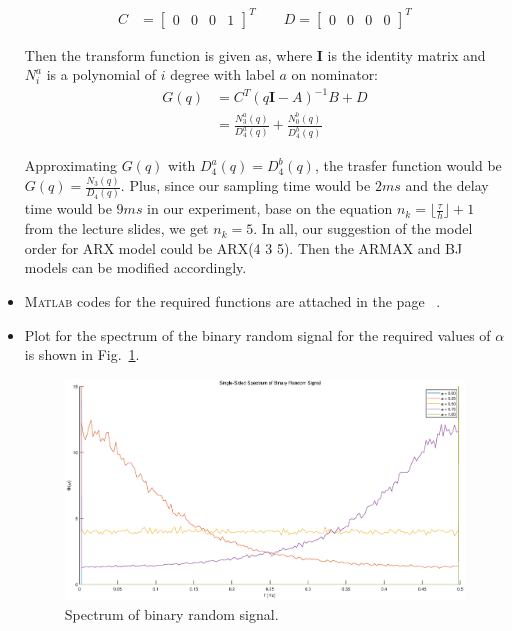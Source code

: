 \documentclass[10pt,a4paper]{article}
\begin{document}
\begin{itemize}
\begin{align}
		C &= \begin{bmatrix} 0 & 0 & 0 & 1 \end{bmatrix}^{T} \qquad D = \begin{bmatrix} 0 & 0 & 0 & 0 \end{bmatrix}^{T}
	\end{align}
	\par Then the transform function is given as, where $\mathbf{I}$ is the identity matrix and $N^{a}_{i}$ is a polynomial of $i$ degree with label $a$ on nominator:
	\begin{align}
		G(q) &= C^{T}(q \mathbf{I} - A)^{-1}B + D \\
		&= \frac{N^{a}_{3}(q)}{D^{a}_{4}(q)} + \frac{N^{b}_{0}(q)}{D^{b}_{4}(q)}
	\end{align}
	\par Approximating $G(q)$ with $D^{a}_{4}(q) = D^{b}_{4}(q)$, the trasfer function would be $G(q) = \frac{N_{3}(q)}{D_{4}(q)}$. Plus, since our sampling time would be $2ms$ and the delay time would be $9ms$ in our experiment, base on the equation $n_{k} = \lfloor\frac{\tau}{h}\rfloor + 1$ from the lecture slides, we get $n_{k} = 5$. In all, our suggestion of the model order for ARX model could be ARX(4 3 5). Then the ARMAX and BJ models can be modified accordingly.
    \item \textsc{Matlab} codes for the required functions are attached in the page ~\pageref{matlabCode}.
    \item Plot for the spectrum of the binary random signal for the required values of $\alpha$ is shown in Fig.~\ref{fig:binarySpectrum}.
	\begin{figure}[h]
		\footnotesize
		\centering 
		\includegraphics[width=0.7\columnwidth]{binarySpectrum.eps} 
		\caption{Spectrum of binary random signal.}
		\label{fig:binarySpectrum}
	\end{figure}
\end{itemize}
\end{document}
